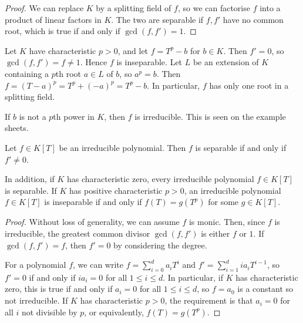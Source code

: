 \begin{proof}
	We can replace \( K \) by a splitting field of \( f \), so we can factorise \( f \) into a product of linear factors in \( K \).
	The two are separable if \( f, f' \) have no common root, which is true if and only if \( \gcd(f, f') = 1 \).
\end{proof}
\begin{example}
	Let \( K \) have characteristic \( p > 0 \), and let \( f = T^p - b \) for \( b \in K \).
	Then \( f' = 0 \), so \( \gcd(f, f') = f \neq 1 \).
	Hence \( f \) is inseparable.
	Let \( L \) be an extension of \( K \) containing a \( p \)th root \( a \in L \) of \( b \), so \( a^p = b \).
	Then \( f = (T - a)^p = T^p + (-a)^p = T^p - b \).
	In particular, \( f \) has only one root in a splitting field.

	If \( b \) is not a \( p \)th power in \( K \), then \( f \) is irreducible.
	This is seen on the example sheets.
\end{example}
\begin{theorem}
	Let \( f \in K[T] \) be an irreducible polynomial.
	Then \( f \) is separable if and only if \( f' \neq 0 \).

	In addition, if \( K \) has characteristic zero, every irreducible polynomial \( f \in K[T] \) is separable.
	If \( K \) has positive characteristic \( p > 0 \), an irreducible polynomial \( f \in K[T] \) is inseparable if and only if \( f(T) = g(T^p) \) for some \( g \in K[T] \).
\end{theorem}
\begin{proof}
	Without loss of generality, we can assume \( f \) is monic.
	Then, since \( f \) is irreducible, the greatest common divisor \( \gcd(f,f') \) is either \( f \) or \( 1 \).
	If \( \gcd(f,f') = f \), then \( f' = 0 \) by considering the degree.

	For a polynomial \( f \), we can write \( f = \sum_{i=0}^d a_i T^i \) and \( f' = \sum_{i=1}^d i a_i T^{i-1} \), so \( f' = 0 \) if and only if \( i a_i = 0 \) for all \( 1 \leq i \leq d \).
	In particular, if \( K \) has characteristic zero, this is true if and only if \( a_i = 0 \) for all \( 1 \leq i \leq d \), so \( f = a_0 \) is a constant so not irreducible.
	If \( K \) has characteristic \( p > 0 \), the requirement is that \( a_i = 0 \) for all \( i \) not divisible by \( p \), or equivalently, \( f(T) = g(T^p) \).
\end{proof}

